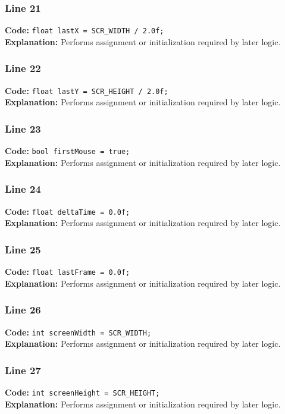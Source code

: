 \documentclass[11pt,a4paper]{article}
\begin{document}
\subsubsection*{Line 21}
\textbf{Code:} \verb|float lastX = SCR_WIDTH / 2.0f;|\\
\textbf{Explanation:} Performs assignment or initialization required by later logic.

\subsubsection*{Line 22}
\textbf{Code:} \verb|float lastY = SCR_HEIGHT / 2.0f;|\\
\textbf{Explanation:} Performs assignment or initialization required by later logic.

\subsubsection*{Line 23}
\textbf{Code:} \verb|bool firstMouse = true;|\\
\textbf{Explanation:} Performs assignment or initialization required by later logic.

\subsubsection*{Line 24}
\textbf{Code:} \verb|float deltaTime = 0.0f;|\\
\textbf{Explanation:} Performs assignment or initialization required by later logic.

\subsubsection*{Line 25}
\textbf{Code:} \verb|float lastFrame = 0.0f;|\\
\textbf{Explanation:} Performs assignment or initialization required by later logic.

\subsubsection*{Line 26}
\textbf{Code:} \verb|int screenWidth = SCR_WIDTH;|\\
\textbf{Explanation:} Performs assignment or initialization required by later logic.

\subsubsection*{Line 27}
\textbf{Code:} \verb|int screenHeight = SCR_HEIGHT;|\\
\textbf{Explanation:} Performs assignment or initialization required by later logic.
\end{document}
